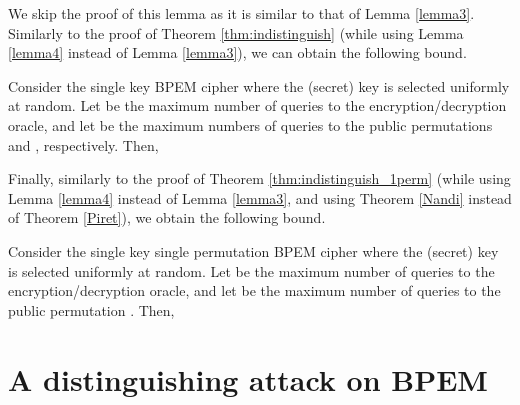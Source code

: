 \documentclass{llncs}
\begin{document}
We skip the proof of this lemma as it is similar to that of Lemma \ref{lemma3}.
Similarly to the proof of Theorem \ref{thm:indistinguish} (while using Lemma \ref{lemma4} instead of Lemma \ref{lemma3}), we can obtain the following bound.
\begin{theorem}
\label{thm:indistinguish_1key}
Consider the single key BPEM cipher  where the (secret) key
 is selected uniformly at random.
Let  be the maximum number of queries to the encryption/decryption oracle, and let  be the maximum numbers of queries to the public permutations  and , respectively. Then, 
\end{theorem}

Finally, similarly to the proof of Theorem \ref{thm:indistinguish_1perm} (while using Lemma \ref{lemma4} instead of Lemma \ref{lemma3}, and using Theorem \ref{Nandi} instead of Theorem \ref{Piret}), we obtain the following bound.
\begin{theorem}
\label{thm:indistinguish_1key_1perm}
Consider the single key single permutation BPEM cipher  where the (secret) key
 is selected uniformly at random.
Let  be the maximum number of queries to the encryption/decryption oracle, and let  be the maximum number  of queries to the public permutation . Then,

\end{theorem}

\section{A distinguishing attack on BPEM}\label{sec:attack}
\end{document}
